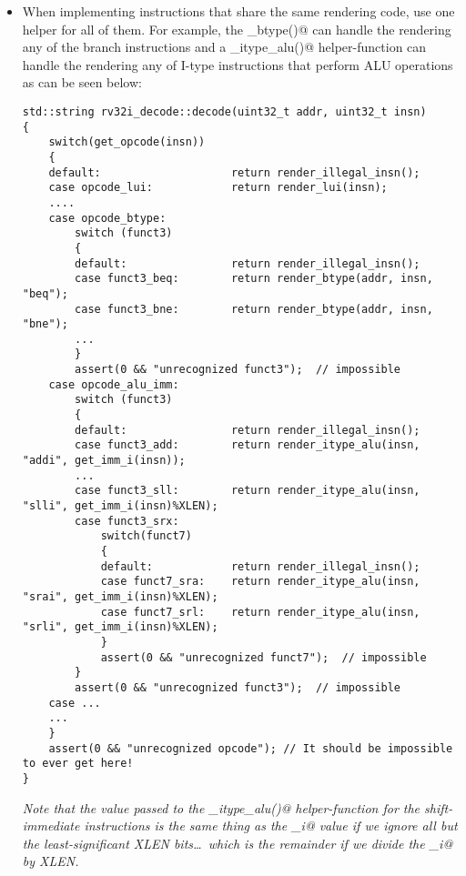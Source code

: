 \documentclass[11pt]{article}
\begin{document}
\begin{itemize}
\item
When implementing instructions that share the same rendering code, use one
helper for all of them.  For example, the \verb@render_btype()@ can handle 
the rendering any of the branch instructions and a \verb@render_itype_alu()@ 
helper-function can handle the rendering any of I-type instructions that 
perform ALU operations as can be seen below:

{\small
\begin{verbatim}
std::string rv32i_decode::decode(uint32_t addr, uint32_t insn)
{
    switch(get_opcode(insn))
    {
    default:                    return render_illegal_insn();
    case opcode_lui:            return render_lui(insn);
    ....
    case opcode_btype:
        switch (funct3)
        {
        default:                return render_illegal_insn();
        case funct3_beq:        return render_btype(addr, insn, "beq"); 
        case funct3_bne:        return render_btype(addr, insn, "bne"); 
        ...
        }
        assert(0 && "unrecognized funct3");  // impossible
    case opcode_alu_imm:
        switch (funct3)
        {
        default:                return render_illegal_insn();
        case funct3_add:        return render_itype_alu(insn, "addi", get_imm_i(insn));
        ...
        case funct3_sll:        return render_itype_alu(insn, "slli", get_imm_i(insn)%XLEN);
        case funct3_srx: 
            switch(funct7)
            {
            default:            return render_illegal_insn(); 
            case funct7_sra:    return render_itype_alu(insn, "srai", get_imm_i(insn)%XLEN);
            case funct7_srl:    return render_itype_alu(insn, "srli", get_imm_i(insn)%XLEN);
            }
            assert(0 && "unrecognized funct7");  // impossible
        }
        assert(0 && "unrecognized funct3");  // impossible
    case ...
    ...
    }
    assert(0 && "unrecognized opcode"); // It should be impossible to ever get here!
}
\end{verbatim}
}

{\em Note that the \verb@shamt@ value passed to the \verb@render_itype_alu()@
helper-function for the shift-immediate instructions is the same thing as 
the \verb@imm_i@ value if we ignore all but the least-significant XLEN 
bits\ldots\ which is the remainder if we divide the \verb@imm_i@ by XLEN.}


\end{itemize}
\end{document}
